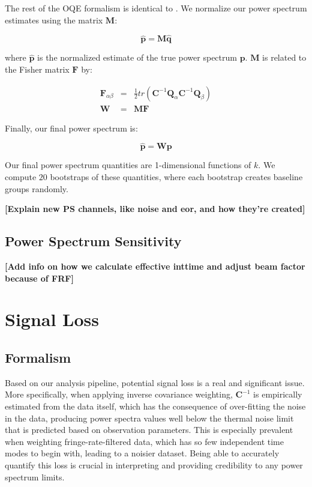 \documentclass[preprint2,numberedappendix,tighten,twocolappendix]{aastex6}  %
\newcommand{\cc}[1]{{\color{purple} \textbf{[#1]}}}
\begin{document}
The rest of the OQE formalism is identical to \citet{ali_et_al2015}. We normalize our power spectrum estimates using the matrix $\textbf{M}$:

\begin{equation}
\hat{\textbf{p}} = \textbf{M}\hat{\textbf{q}}
\end{equation}

where $\hat{\textbf{p}}$ is the normalized estimate of the true power spectrum $\textbf{p}$. $\textbf{M}$ is related to the Fisher matrix $\textbf{F}$ by:

\begin{eqnarray}
\textbf{F}_{\alpha\beta} &=& \frac{1}{2}tr(\textbf{C}^{-1}\textbf{Q}_{\alpha}\textbf{C}^{-1}\textbf{Q}_{\beta}) \\
\textbf{W} &=& \textbf{MF}
\end{eqnarray}

Finally, our final power spectrum is:

\begin{equation}
\hat{\textbf{p}} = \textbf{Wp}
\end{equation}

Our final power spectrum quantities are 1-dimensional functions of $k$. We compute $20$ bootstraps of these quantities, where each bootstrap creates baseline groups randomly.

\cc{Explain new PS channels, like noise and eor, and how they're created}

\subsection{Power Spectrum Sensitivity}
\label{sec:PSSense}

\cc{Add info on how we calculate effective inttime and adjust beam factor because of FRF}

\section{Signal Loss}
\label{sec:Sigloss}

\subsection{Formalism}
\label{sec:Formalism}

Based on our analysis pipeline, potential signal loss is a real and significant issue. More specifically, when applying inverse covariance weighting, $\textbf{C}^{-1}$ is empirically estimated from the data itself, which has the consequence of over-fitting the noise in the data, producing power spectra values well below the thermal noise limit that is predicted based on observation parameters. This is especially prevalent when weighting fringe-rate-filtered data, which has so few independent time modes to begin with, leading to a noisier dataset. Being able to accurately quantify this loss is crucial in interpreting and providing credibility to any power spectrum limits. 
\end{document}
